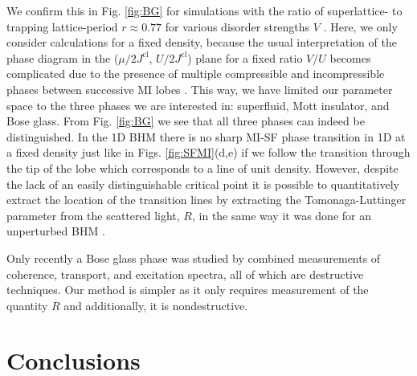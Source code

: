 We confirm this in Fig. \ref{fig:BG} for simulations with the ratio of
superlattice- to trapping lattice-period $r\approx 0.77$ for various
disorder strengths $V$ \cite{roux2008}. Here, we only consider
calculations for a fixed density, because the usual interpretation of
the phase diagram in the ($\mu/2J^\text{cl}$, $U/2J^\text{cl}$) plane
for a fixed ratio $V/U$ becomes complicated due to the presence of
multiple compressible and incompressible phases between successive MI
lobes \cite{roux2008}. This way, we have limited our parameter space
to the three phases we are interested in: superfluid, Mott insulator,
and Bose glass. From Fig. \ref{fig:BG} we see that all three phases
can indeed be distinguished. In the 1D BHM there is no sharp MI-SF
phase transition in 1D at a fixed density \cite{cazalilla2011,
  ejima2011, kuhner2000, pino2012, pino2013} just like in
Figs. \ref{fig:SFMI}(d,e) if we follow the transition through the tip
of the lobe which corresponds to a line of unit density. However,
despite the lack of an easily distinguishable critical point it is
possible to quantitatively extract the location of the transition
lines by extracting the Tomonaga-Luttinger parameter from the
scattered light, $R$, in the same way it was done for an unperturbed
BHM \cite{ejima2011}.

Only recently \cite{derrico2014} a Bose glass phase was studied by
combined measurements of coherence, transport, and excitation spectra,
all of which are destructive techniques. Our method is simpler as it
only requires measurement of the quantity $R$ and additionally, it is
nondestructive.

\section{Conclusions}

